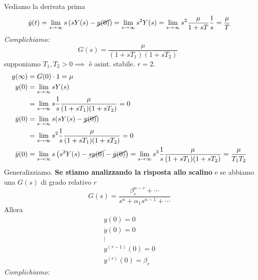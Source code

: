 Vediamo la derivata prima
\begin{equation*}
	\dot{y}(t) =\lim _{s\to \infty } s\left(sY(s) -\cancel{y(0)}\right) =\lim _{s\to \infty } s^2 Y(s) =\lim _{s\to \infty } s^2\frac{\mu }{1+sT}\frac{1}{s} =\frac{\mu }{T}
\end{equation*}
\textit{Complichiamo:}
\begin{equation*}
	G(s)=\frac{\mu }{(1+sT_1)(1+sT_2)} \ \ 
\end{equation*}
supponiamo $T_1 ,T_2  >0\implies $ è asint. stabile. $r=2$.
\begin{equation*}
	\begin{aligned}
		y(\infty)    & =G(0)\cdot 1=\mu                                                                                                                                                                          \\
		y(0)         & =\lim _{s\to \infty } sY(s)                                                                                                                                                       \\
		             & =\lim _{s\to \infty } s\frac{1}{s}\frac{\mu }{(1+sT_1)(1+sT_2)} =0                                                                                                                \\
		\dot{y} (0)  & =\lim _{s\to \infty } s(sY(s)-\cancel{y(0)})                                                                                                                                      \\
		             & =\lim _{s\to \infty } s^2\frac{1}{s}\frac{\mu }{(1+sT_1)(1+sT_2)} =0                                                                                                              \\
		\ddot{y} (0) & =\lim _{s\to \infty } s\left(s^2 Y(s)-\cancel{sy(0)} -\cancel{\dot{y} (0)}\right) =\lim _{s\to \infty } s^3\frac{1}{s}\frac{\mu }{(1+sT_1)(1+sT_2)} =\frac{\mu }{T_1 T_2} 
	\end{aligned}
\end{equation*}
Generalizziamo. \textbf{Se stiamo analizzando la risposta allo scalino} e se abbiamo una $G(s)$ di grado relativo $r$
\begin{equation*}
	G(s) =\frac{\beta ^{n-r}_r +\cdots }{s^n +\alpha _1 s^{n-1} +\cdots }
\end{equation*}
Allora
\begin{equation*}
	\boxed{
		\begin{array}{ c }
			y(0) =0              \\
			\dot{y}(0) =0        \\
			\vdots               \\
			y^{(r-1)}(0) =0      \\
			y^{(r)}(0) =\beta _r 
		\end{array}
	}
\end{equation*}
\textit{Complichiamo:}

